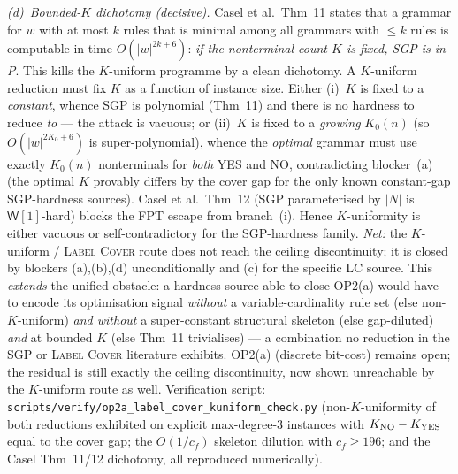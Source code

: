 \documentclass[
]{article}
\begin{document}
\emph{(d)~Bounded-$K$ dichotomy (decisive).} Casel et al.\ Thm~11
states that a grammar for $w$ with at most $k$ rules that is minimal
among all grammars with $\leq k$ rules is computable in time
$O(|w|^{2k+6})$: \emph{if the nonterminal count $K$ is fixed, SGP is
in {\rm P}}. This kills the $K$-uniform programme by a clean
dichotomy. A $K$-uniform reduction must fix $K$ as a function of
instance size. Either (i)~$K$ is fixed to a \emph{constant}, whence
SGP is polynomial (Thm~11) and there is no hardness to reduce
\emph{to} --- the attack is vacuous; or (ii)~$K$ is fixed to a
\emph{growing} $K_0(n)$ (so $O(|w|^{2K_0+6})$ is super-polynomial),
whence the \emph{optimal} grammar must use exactly $K_0(n)$
nonterminals for \emph{both} YES and NO, contradicting blocker~(a)
(the optimal $K$ provably differs by the cover gap for the only known
constant-gap SGP-hardness sources). Casel et al.\ Thm~12
(SGP parameterised by $|N|$ is $\mathsf{W}[1]$-hard) blocks the FPT
escape from branch~(i). Hence $K$-uniformity is either vacuous or
self-contradictory for the SGP-hardness family. \emph{Net:} the
$K$-uniform / \textsc{Label Cover} route does not reach the ceiling
discontinuity; it is closed by blockers (a),(b),(d) unconditionally
and (c) for the specific \textsc{LC} source. This \emph{extends} the
unified obstacle: a hardness source able to close OP2(a) would have to
encode its optimisation signal \emph{without} a variable-cardinality
rule set (else non-$K$-uniform) \emph{and without} a super-constant
structural skeleton (else gap-diluted) \emph{and} at bounded $K$
(else Thm~11 trivialises) --- a combination no reduction in the SGP
or \textsc{Label Cover} literature exhibits. OP2(a) (discrete
bit-cost) remains open; the residual is still exactly the ceiling
discontinuity, now shown unreachable by the $K$-uniform route as well.
Verification script:
\texttt{scripts/verify/op2a\_label\_cover\_kuniform\_check.py}
(non-$K$-uniformity of both reductions exhibited on explicit
max-degree-3 instances with $K_{\rm NO} - K_{\rm YES}$ equal to the
cover gap; the $O(1/c_f)$ skeleton dilution with $c_f \geq 196$;
and the Casel Thm~11/12 dichotomy, all reproduced numerically).
\end{document}
